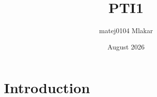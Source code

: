 \documentclass{article}
\title{PTI1}
\author{matej0104 Mlakar}
\date{August 2026}
\begin{document}
\maketitle

\section{Introduction}
\end{document}
